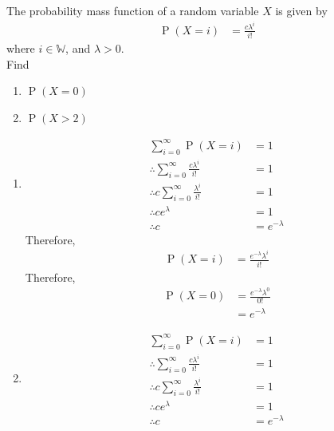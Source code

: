 \documentclass[titlepage, fleqn, a4paper, 12pt, twoside]{article}
\theoremstyle{definition}
\theoremstyle{theorem}
\DeclareMathOperator{\prob}{\mathrm{P}}
\begin{document}
\begin{question}
	The probability mass function of a random variable $X$ is given by
	\begin{align*}
		\prob(X = i) & = \frac{c \lambda^i}{i!}
	\end{align*}
	where $i \in \mathbb{W}$, and $\lambda > 0$.\\
	Find
	\begin{enumerate}
		\item $\prob(X = 0)$
		\item $\prob(X > 2)$
	\end{enumerate}
\end{question}

\begin{solution}
	\begin{enumerate}[leftmargin=*]
		\item
			\begin{align*}
				\sum\limits_{i = 0}^{\infty} \prob(X = i)                      & = 1 \\
				\therefore \sum\limits_{i = 0}^{\infty} \frac{c \lambda^i}{i!} & = 1 \\
				\therefore c \sum\limits_{i = 0}^{\infty} \frac{\lambda^i}{i!} & = 1 \\
				\therefore c e^{\lambda}                                       & = 1 \\
				\therefore c                                                   & = e^{-\lambda}
			\end{align*}
			Therefore,
			\begin{align*}
				\prob(X = i) & = \frac{e^{-\lambda} \lambda^i}{i!}
			\end{align*}
			Therefore,
			\begin{align*}
				\prob(X = 0) & = \frac{e^{-\lambda} \lambda^0}{0!} \\
                                             & = e^{-\lambda}
			\end{align*}
		\item
			\begin{align*}
				\sum\limits_{i = 0}^{\infty} \prob(X = i)                      & = 1 \\
				\therefore \sum\limits_{i = 0}^{\infty} \frac{c \lambda^i}{i!} & = 1 \\
				\therefore c \sum\limits_{i = 0}^{\infty} \frac{\lambda^i}{i!} & = 1 \\
				\therefore c e^{\lambda}                                       & = 1 \\
				\therefore c                                                   & = e^{-\lambda}

\end{align*}
\end{enumerate}
\end{solution}
\end{document}
